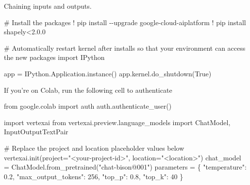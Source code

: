 \documentclass[
  letterpaper,
  DIV=11,
  numbers=noendperiod]{scrreprt}
\newenvironment{Shaded}{\begin{snugshade}}{\end{snugshade}}
\newcommand{\CommentTok}[1]{\textcolor[rgb]{0.37,0.37,0.37}{#1}}
\newcommand{\DecValTok}[1]{\textcolor[rgb]{0.68,0.00,0.00}{#1}}
\newcommand{\FloatTok}[1]{\textcolor[rgb]{0.68,0.00,0.00}{#1}}
\newcommand{\ImportTok}[1]{\textcolor[rgb]{0.00,0.46,0.62}{#1}}
\newcommand{\NormalTok}[1]{\textcolor[rgb]{0.00,0.23,0.31}{#1}}
\newcommand{\OperatorTok}[1]{\textcolor[rgb]{0.37,0.37,0.37}{#1}}
\newcommand{\StringTok}[1]{\textcolor[rgb]{0.13,0.47,0.30}{#1}}
\newcommand{\VariableTok}[1]{\textcolor[rgb]{0.07,0.07,0.07}{#1}}
\begin{document}
Chaining inputs and outputs.

\begin{Shaded}
\begin{Highlighting}[]
\CommentTok{\# Install the packages}
\OperatorTok{!}\NormalTok{ pip install }\OperatorTok{{-}{-}}\NormalTok{upgrade google}\OperatorTok{{-}}\NormalTok{cloud}\OperatorTok{{-}}\NormalTok{aiplatform}
\OperatorTok{!}\NormalTok{ pip install shapely}\OperatorTok{\textless{}}\FloatTok{2.0.0}
\end{Highlighting}
\end{Shaded}

\begin{Shaded}
\begin{Highlighting}[]
\CommentTok{\# Automatically restart kernel after installs so that your environment can access the new packages}
\ImportTok{import}\NormalTok{ IPython}

\NormalTok{app }\OperatorTok{=}\NormalTok{ IPython.Application.instance()}
\NormalTok{app.kernel.do\_shutdown(}\VariableTok{True}\NormalTok{)}
\end{Highlighting}
\end{Shaded}

If you're on Colab, run the following cell to authenticate

\begin{Shaded}
\begin{Highlighting}[]
\ImportTok{from}\NormalTok{ google.colab }\ImportTok{import}\NormalTok{ auth}
\NormalTok{auth.authenticate\_user()}
\end{Highlighting}
\end{Shaded}

\begin{Shaded}
\begin{Highlighting}[]
\ImportTok{import}\NormalTok{ vertexai}
\ImportTok{from}\NormalTok{ vertexai.preview.language\_models }\ImportTok{import}\NormalTok{ ChatModel, InputOutputTextPair}

\CommentTok{\# Replace the project and location placeholder values below}
\NormalTok{vertexai.init(project}\OperatorTok{=}\StringTok{"\textless{}your{-}project{-}id\textgreater{}"}\NormalTok{, location}\OperatorTok{=}\StringTok{"\textless{}location\textgreater{}"}\NormalTok{)}
\NormalTok{chat\_model }\OperatorTok{=}\NormalTok{ ChatModel.from\_pretrained(}\StringTok{"chat{-}bison@001"}\NormalTok{)}
\NormalTok{parameters }\OperatorTok{=}\NormalTok{ \{}
    \StringTok{"temperature"}\NormalTok{: }\FloatTok{0.2}\NormalTok{,}
    \StringTok{"max\_output\_tokens"}\NormalTok{: }\DecValTok{256}\NormalTok{,}
    \StringTok{"top\_p"}\NormalTok{: }\FloatTok{0.8}\NormalTok{,}
    \StringTok{"top\_k"}\NormalTok{: }\DecValTok{40}
\NormalTok{\}}
\end{Highlighting}
\end{Shaded}
\end{document}
